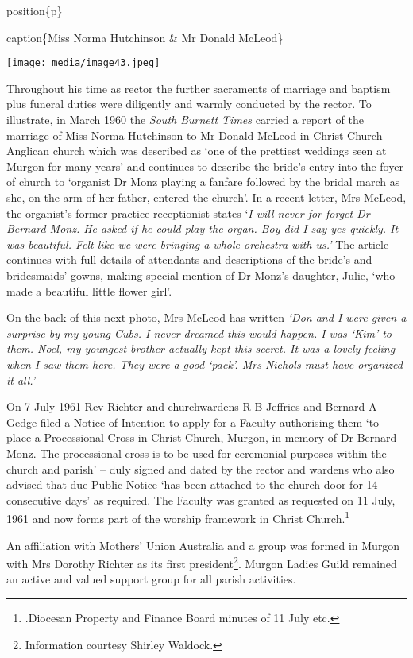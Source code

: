 position\{p\}

caption\{Miss Norma Hutchinson \& Mr Donald McLeod\}

\texttt{[image: media/image43.jpeg]}

Throughout his time as rector the further sacraments of marriage and baptism plus funeral duties were diligently and warmly conducted by the rector. To illustrate, in March 1960 the \emph{South Burnett Times} carried a report of the marriage of Miss Norma Hutchinson to Mr Donald McLeod in Christ Church Anglican church which was described as `one of the prettiest weddings seen at Murgon for many years' and continues to describe the bride's entry into the foyer of church to `organist Dr Monz playing a fanfare followed by the bridal march as she, on the arm of her father, entered the church'. In a recent letter, Mrs McLeod, the organist's former practice receptionist states `\emph{I will never for forget Dr Bernard Monz. He asked if he could play the organ. Boy did I say yes quickly. It was beautiful. Felt like we were bringing a whole orchestra with us.'} The article continues with full details of attendants and descriptions of the bride's and bridesmaids' gowns, making special mention of Dr Monz's daughter, Julie, `who made a beautiful little flower girl'.

On the back of this next photo, Mrs McLeod has written \emph{`Don and I were given a surprise by my young Cubs. I never dreamed this would happen. I was `Kim' to them. Noel, my youngest brother actually kept this secret. It was a lovely feeling when I saw them here. They were a good `pack'. Mrs Nichols must have organized it all.'}

On 7 July 1961 Rev Richter and churchwardens R B Jeffries and Bernard A Gedge filed a Notice of Intention to apply for a Faculty authorising them `to place a Processional Cross in Christ Church, Murgon, in memory of Dr Bernard Monz. The processional cross is to be used for ceremonial purposes within the church and parish' -- duly signed and dated by the rector and wardens who also advised that due Public Notice `has been attached to the church door for 14 consecutive days' as required. The Faculty was granted as requested on 11 July, 1961 and now forms part of the worship framework in Christ Church.\footnote{.Diocesan Property and Finance Board minutes of 11 July etc.}

An affiliation with Mothers' Union Australia and a group was formed in Murgon with Mrs Dorothy Richter as its first president\footnote{Information courtesy Shirley Waldock.}. Murgon Ladies Guild remained an active and valued support group for all parish activities.

